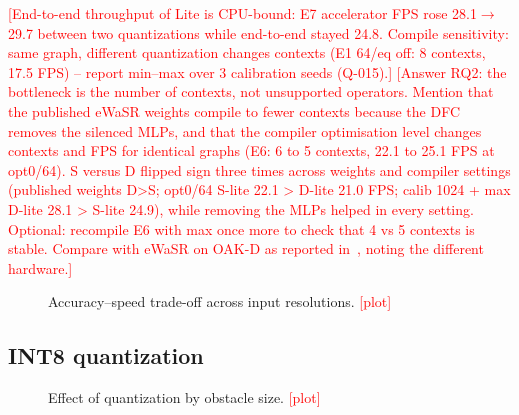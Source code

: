 \documentclass[conference]{IEEEtran}
\newcommand{\tbd}[1]{\textcolor{red}{[#1]}}
\newcommand{\figplaceholder}[2]{\fbox{\parbox[c][#2][c]{0.95\linewidth}{\centering\small\textcolor{red}{#1}}}}
\begin{document}
\tbd{End-to-end throughput of Lite is CPU-bound: E7 accelerator FPS rose 28.1$\to$29.7 between two quantizations while end-to-end stayed 24.8. Compile sensitivity: same graph, different quantization changes contexts (E1 64/eq off: 8 contexts, 17.5 FPS) -- report min--max over 3 calibration seeds (Q-015).} \tbd{Answer RQ2: the bottleneck is the number of contexts, not unsupported operators. Mention that the published eWaSR weights compile to fewer contexts because the DFC removes the silenced MLPs, and that the compiler optimisation level changes contexts and FPS for identical graphs (E6: 6 to 5 contexts, 22.1 to 25.1 FPS at opt0/64). S versus D flipped sign three times across weights and compiler settings (published weights D>S; opt0/64 S-lite 22.1 > D-lite 21.0 FPS; calib 1024 + max D-lite 28.1 > S-lite 24.9), while removing the MLPs helped in every setting. Optional: recompile E6 with max once more to check that 4 vs 5 contexts is stable. Compare with eWaSR on OAK-D as reported in~\cite{tersek2023ewasr}, noting the different hardware.}

\begin{figure}[t]
\centering
\figplaceholder{Fig.~2: F1 on MODS versus FPS on Hailo-8L for input resolutions 288$\times$384, 384$\times$512, 480$\times$640 (Pareto front).}{3.6cm}
\caption{Accuracy--speed trade-off across input resolutions. \tbd{plot}}
\label{fig:pareto}
\end{figure}

\subsection{INT8 quantization}
\label{sec:quant}
\begin{figure}[t]
\centering
\figplaceholder{Fig.~3: MODS recall/F1 per obstacle-size bin for FP32, INT8 PTQ, INT8 + QFT (eWaSR-Lite).}{3.6cm}
\caption{Effect of quantization by obstacle size. \tbd{plot}}
\label{fig:quant}
\end{figure}
\end{document}
